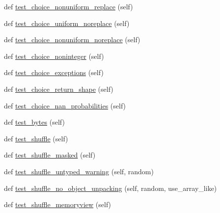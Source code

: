 \begin{DoxyCompactItemize}
def \hyperlink{classnumpy_1_1random_1_1tests_1_1test__random_1_1TestRandomDist_a4a9611a3a013ca620cd6e49269835aac}{test\+\_\+choice\+\_\+nonuniform\+\_\+replace} (self)
\item 
def \hyperlink{classnumpy_1_1random_1_1tests_1_1test__random_1_1TestRandomDist_acb06968f36c081dc70464d6050e0b7b6}{test\+\_\+choice\+\_\+uniform\+\_\+noreplace} (self)
\item 
def \hyperlink{classnumpy_1_1random_1_1tests_1_1test__random_1_1TestRandomDist_ae345a28af0e56ffe40012222bc94220a}{test\+\_\+choice\+\_\+nonuniform\+\_\+noreplace} (self)
\item 
def \hyperlink{classnumpy_1_1random_1_1tests_1_1test__random_1_1TestRandomDist_a0f9b29de5b9917fa3ff6aae4a8b22a0f}{test\+\_\+choice\+\_\+noninteger} (self)
\item 
def \hyperlink{classnumpy_1_1random_1_1tests_1_1test__random_1_1TestRandomDist_a4644e251604377354fe45e66664f35d8}{test\+\_\+choice\+\_\+exceptions} (self)
\item 
def \hyperlink{classnumpy_1_1random_1_1tests_1_1test__random_1_1TestRandomDist_a563d947f34cfa990e0d7ca63094ed26c}{test\+\_\+choice\+\_\+return\+\_\+shape} (self)
\item 
def \hyperlink{classnumpy_1_1random_1_1tests_1_1test__random_1_1TestRandomDist_aaa94920bd98b5199bacbb7d46b38beb7}{test\+\_\+choice\+\_\+nan\+\_\+probabilities} (self)
\item 
def \hyperlink{classnumpy_1_1random_1_1tests_1_1test__random_1_1TestRandomDist_a3891196a094c5bd36db7b3c951da50a0}{test\+\_\+bytes} (self)
\item 
def \hyperlink{classnumpy_1_1random_1_1tests_1_1test__random_1_1TestRandomDist_aa5ba1ba4cf7f6437ad1f00fa8b7379e2}{test\+\_\+shuffle} (self)
\item 
def \hyperlink{classnumpy_1_1random_1_1tests_1_1test__random_1_1TestRandomDist_a91457d3eabdae46bad3887c6bd9bc8b9}{test\+\_\+shuffle\+\_\+masked} (self)
\item 
def \hyperlink{classnumpy_1_1random_1_1tests_1_1test__random_1_1TestRandomDist_ab93da6b734f6017bdd3c49db9a550302}{test\+\_\+shuffle\+\_\+untyped\+\_\+warning} (self, random)
\item 
def \hyperlink{classnumpy_1_1random_1_1tests_1_1test__random_1_1TestRandomDist_af52a10570688853bbd17e8f9a7c8e635}{test\+\_\+shuffle\+\_\+no\+\_\+object\+\_\+unpacking} (self, random, use\+\_\+array\+\_\+like)
\item 
def \hyperlink{classnumpy_1_1random_1_1tests_1_1test__random_1_1TestRandomDist_a6cec4950f57ca25bda38dbd6bf839e56}{test\+\_\+shuffle\+\_\+memoryview} (self)

\end{DoxyCompactItemize}
